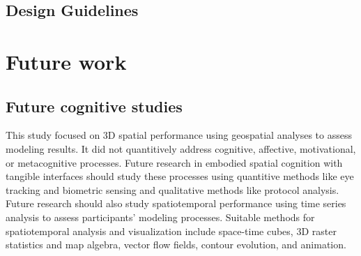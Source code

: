\documentclass[prodmode,acmtochi]{acmsmall} %
\begin{document}
% 
%




\subsection{Design Guidelines}

% 
%














\section{Future work}
%
\subsection{Future cognitive studies}
%
This study focused on 3D spatial performance
using geospatial analyses to assess modeling results. 
%
It did not quantitively address 
cognitive, affective, motivational, or metacognitive processes. 
%
Future research in embodied spatial cognition with tangible interfaces 
should study these processes using quantitive methods like 
eye tracking and biometric sensing 
and qualitative methods like protocol analysis.  
%
Future research should also study spatiotemporal performance
using time series analysis to assess participants' modeling processes.
%
Suitable methods for spatiotemporal analysis and visualization include 
space-time cubes, 3D raster statistics and map algebra, 
vector flow fields, contour evolution, and animation.
\end{document}
